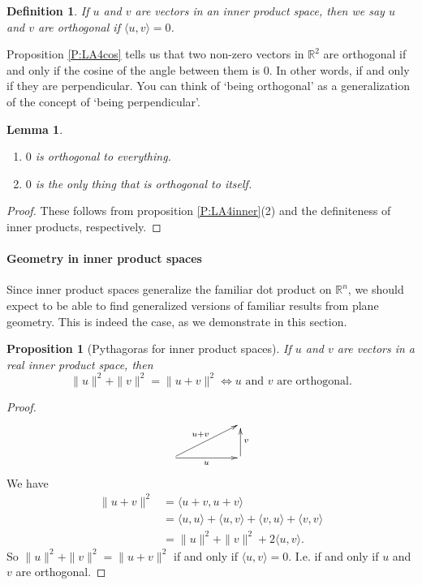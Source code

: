\documentclass{article}
\theoremstyle{plain}
\newtheorem{proposition}[theorem]{Proposition}{\bfseries}{\itshape}
\newtheorem{definition}[theorem]{Definition}{\bfseries}{\upshape}
\newtheorem{lemma}[theorem]{Lemma}{\bfseries}{\upshape}
\newcommand{\bR}{\mathbb{R}}
\begin{document}
\begin{definition}
If $u$ and $v$ are vectors in an inner product space, then we say $u$ and $v$ are \emph{orthogonal} if $\langle u ,v\rangle =0$.
\end{definition}

Proposition \ref{P:LA4cos} tells us that two non-zero vectors in $\bR^2$ are orthogonal if and only if the cosine of the angle between them is 0. In other words, if and only if they are perpendicular. You can think of `being orthogonal' as a generalization of the concept of `being perpendicular'.

\begin{lemma}\mbox{}
\begin{enumerate}
\item $0$ is orthogonal to everything.
\item $0$ is the only thing that is orthogonal to itself.
\end{enumerate}
\end{lemma}
\begin{proof}
These follows from proposition \ref{P:LA4inner}(2) and the definiteness of inner products, respectively.
\end{proof}

\paragraph{Geometry in inner product spaces}
Since inner product spaces generalize the familiar dot product on $\bR^n$, we should expect to be able to find generalized versions of familiar results from plane geometry. This is indeed the case, as we demonstrate in this section.

\begin{proposition}[Pythagoras for inner product spaces]\label{P:LA4pythag}
If $u$ and $v$ are vectors in a real inner product space, then
\[\|u\|^2+\|v\|^2 = \|u+v\|^2 \iff u\text{ and } v \text{ are orthogonal}.\]
\end{proposition}
\begin{proof}
\[\xymatrix{ & & \\
 \ar[rr]_u\ar[rru]^{u+v}& &\ar[u]_v
}\] 
We have
\begin{align*}
\|u+v\|^2 &= \langle u+v, u+v\rangle \\
&= \langle u, u \rangle + \langle u, v \rangle + \langle v,u \rangle + \langle v,v \rangle \\
&= \|u\|^2+\|v\|^2 + 2\langle u, v\rangle. 
\end{align*}
So $\|u\|^2+\|v\|^2 = \|u+v\|^2$ if and only if $\langle u, v\rangle = 0$. I.e. if and only if $u$ and $v$ are orthogonal.
\end{proof}
\end{document}
